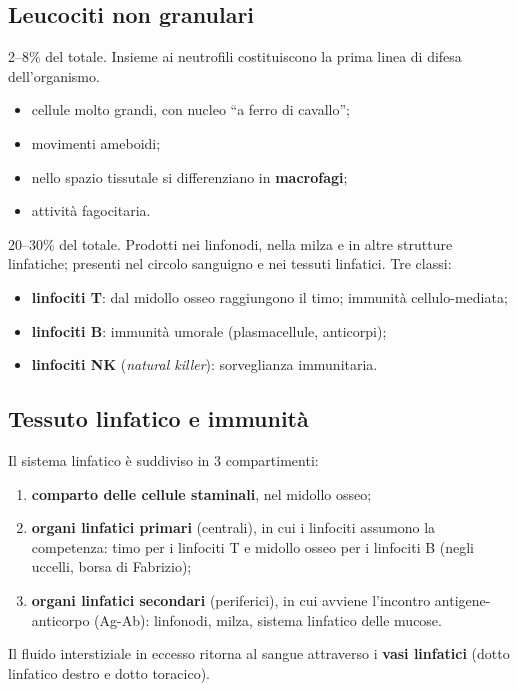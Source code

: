 \subsection{Leucociti non granulari}

2--8\% del totale. Insieme ai neutrofili costituiscono la prima linea di difesa dell'organismo.
\begin{itemize}
  \item cellule molto grandi, con nucleo ``a ferro di cavallo'';
  \item movimenti ameboidi;
  \item nello spazio tissutale si differenziano in \textbf{macrofagi};
  \item attività fagocitaria.
\end{itemize}

20--30\% del totale. Prodotti nei linfonodi, nella milza e in altre strutture linfatiche; presenti nel circolo sanguigno e nei tessuti linfatici. Tre classi:
\begin{itemize}
  \item \textbf{linfociti T}: dal midollo osseo raggiungono il timo; immunità cellulo-mediata;
  \item \textbf{linfociti B}: immunità umorale (plasmacellule, anticorpi);
  \item \textbf{linfociti NK} (\textit{natural killer}): sorveglianza immunitaria.
\end{itemize}

\subsection{Tessuto linfatico e immunità}

Il sistema linfatico è suddiviso in 3 compartimenti:
\begin{enumerate}
  \item \textbf{comparto delle cellule staminali}, nel midollo osseo;
  \item \textbf{organi linfatici primari} (centrali), in cui i linfociti assumono la competenza: timo per i linfociti T e midollo osseo per i linfociti B (negli uccelli, borsa di Fabrizio);
  \item \textbf{organi linfatici secondari} (periferici), in cui avviene l'incontro antigene-anticorpo (Ag-Ab): linfonodi, milza, sistema linfatico delle mucose.
\end{enumerate}
Il fluido interstiziale in eccesso ritorna al sangue attraverso i \textbf{vasi linfatici} (dotto linfatico destro e dotto toracico).

